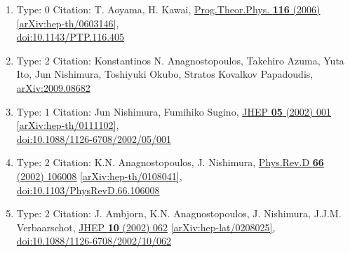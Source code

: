 \documentclass[a4paper,10pt]{article}
\begin{document}
\begin{enumerate}
\begin{enumerate}
  \item Type: 0 Citation: T. Aoyama, H. Kawai, \href{https://www.doi.org/10.1143/PTP.116.405}{Prog.Theor.Phys. {\bf 116} (2006) }  \href{https://arxiv.org/abs/hep-th/0603146}{[arXiv:hep-th/0603146]},\\\href{https://www.doi.org/10.1143/PTP.116.405}{doi:10.1143/PTP.116.405}
  \item Type: 2 Citation: Konstantinos N. Anagnostopoulos, Takehiro Azuma, Yuta Ito, Jun Nishimura, Toshiyuki Okubo, Stratos Kovalkov Papadoudis, \href{https://arxiv.org/abs/2009.08682}{arXiv:2009.08682}
  \item Type: 1 Citation: Jun Nishimura, Fumihiko Sugino, \href{https://www.doi.org/10.1088/1126-6708/2002/05/001}{JHEP {\bf 05} (2002) 001}  \href{https://arxiv.org/abs/hep-th/0111102}{[arXiv:hep-th/0111102]},\\\href{https://www.doi.org/10.1088/1126-6708/2002/05/001}{doi:10.1088/1126-6708/2002/05/001}
  \item Type: 2 Citation: K.N. Anagnostopoulos, J. Nishimura, \href{https://www.doi.org/10.1103/PhysRevD.66.106008}{Phys.Rev.D {\bf 66} (2002) 106008}  \href{https://arxiv.org/abs/hep-th/0108041}{[arXiv:hep-th/0108041]},\\\href{https://www.doi.org/10.1103/PhysRevD.66.106008}{doi:10.1103/PhysRevD.66.106008}
  \item Type: 2 Citation: J. Ambjorn, K.N. Anagnostopoulos, J. Nishimura, J.J.M. Verbaarschot, \href{https://www.doi.org/10.1088/1126-6708/2002/10/062}{JHEP {\bf 10} (2002) 062}  \href{https://arxiv.org/abs/hep-lat/0208025}{[arXiv:hep-lat/0208025]},\\\href{https://www.doi.org/10.1088/1126-6708/2002/10/062}{doi:10.1088/1126-6708/2002/10/062}

\end{enumerate}
\end{enumerate}
\end{document}
